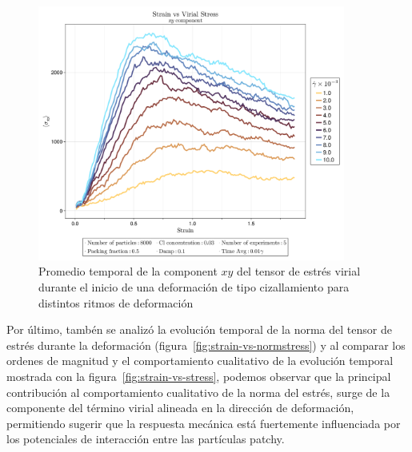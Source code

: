 \documentclass[../main.tex]{subfiles}
\begin{document}
\begin{figure}[h]
    \centering
    \includegraphics[width=0.9\textwidth]{../Figures/system-2025-05-22-194804-CL-0.03/Strain-vs-Stress-Zoom.png}
    \caption{Promedio temporal de la component $xy$ del tensor de estrés virial durante el inicio de una deformación de tipo cizallamiento para distintos ritmos de deformación}\label{fig:Zoomstrain-vs-stress}
\end{figure}

Por último, tambén se analizó la evolución temporal de la norma del tensor de estrés durante la deformación (figura~\ref{fig:strain-vs-normstress}) y al comparar los ordenes de magnitud y el comportamiento cualitativo de la evolución temporal mostrada con la figura~\ref{fig:strain-vs-stress}, podemos observar que la principal contribución al comportamiento cualitativo de la norma del estrés, surge de la componente del término virial alineada en la dirección de deformación, permitiendo sugerir que la respuesta mecánica está fuertemente influenciada por los potenciales de interacción entre las partículas patchy.
\end{document}
